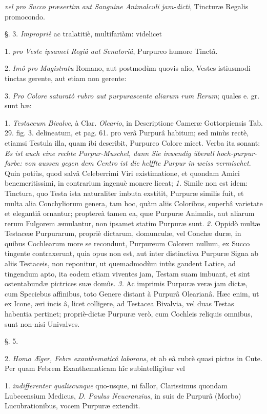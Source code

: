 \documentclass[a4paper, 11pt, oneside, polutonikogreek, german]{article}
\begin{document}
\emph{vel pro Succo præsertim aut Sanguine Animalculi jam-dicti}, Tincturæ Regalis promocondo.

§. 3. \emph{Impropriè} ac tralatitiè, multifariàm: videlicet

1. \emph{pro Veste ipsamet Regiâ aut Senatoriâ}, Purpureo humore Tinctâ.

2. \emph{Imô pro Magistratu} Romano, aut postmodùm quovis alio, Vestes istiusmodi tinctas gerente, aut etiam non gerente:

3. \emph{Pro Colore saturatò rubro aut purpurascente aliarum rum Rerum}; quales e. gr. sunt hæ:

1. \emph{Testaceum Bivalve}, à Clar. \emph{Oleario}, in Descriptione Cameræ Gottorpiensis Tab. 29. fig. 3. delineatum, et pag. 61. pro verâ Purpurâ habitum; sed minùs rectè, etiamsi Testula illa, quam ibi describit, Purpureo Colore micet. Verba ita sonant: \emph{Es ist auch eine rechte Purpur-Muschel, dann Sie inwendig überall hoch-purpur-farbe: von aussen gegen dem Centro ist die helffte Purpur in weiss vermischet}. Quin potiùs, quod salvâ Celeberrimi Viri existimatione, et quondam Amici benemeritissimi, in contrarium ingenuè monere liceat; \emph{1.} Simile non est idem: Tinctura, quo Testa ista naturaliter imbuta exstitit, Purpuræ similis fuit, et multa alia Conchyliorum genera, tam hoc, quàm aliis Coloribus, superbâ varietate et elegantiâ ornantur; proptereà tamen ea, quæ Purpuræ Animalis, aut aliarum rerum Fulgorem æmulantur, non ipsamet statim Purpuræ sunt. \emph{2.} Oppidò multæ Testaceæ Purpurarum, propriè dictarum, domunculæ, vel Conchæ duræ, in quibus Cochlearum more se recondunt, Purpureum Colorem nullum, ex Succo tingente contraxerunt, quia opus non est, aut inter distinctiva Purpuræ Signa ab aliis Testaceis, non reponitur, ut quemadmodùm intùs gaudent Latice, ad tingendum apto, ita eodem etiam viventes jam, Testam suam imbuant, et sint ostentabundæ pictrices suæ domûs. \emph{3.} Ac imprimis Purpuræ veræ jam dictæ, cum Speciebus affinibus, toto Genere distant à Purpurâ Olearianâ. Hæc enim, ut ex Icone, æri incis â, licet colligere, ad Testacea Bivalvia, vel duas Testas habentia pertinet; propriè-dictæ Purpuræ verò, cum Cochleis reliquis omnibus, sunt non-nisi Univalves.

§. 5.

2. \emph{Homo Æger, Febre exanthematicâ laborans}, et ab eâ rubrè quasi pictus in Cute. Per quam Febrem Exanthematicam hîc subintelligitur vel

1. \emph{indifferenter qualiscunque} quo-usque, ni fallor, Clarissimus quondam Lubecensium Medicus, \emph{D. Paulus Neucranzius}, in suis de Purpurâ (Morbo) Lucubrationibus, vocem Purpuræ extendit.
\end{document}
